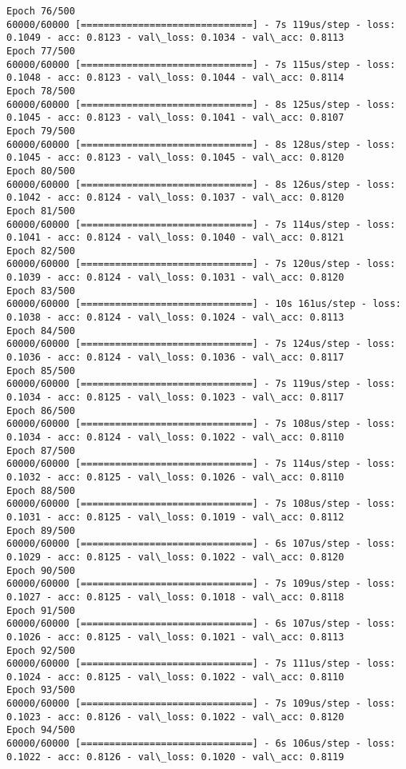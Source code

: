 \documentclass[11pt]{article}
\begin{document}
\begin{Verbatim}[commandchars=\\\{\}]
Epoch 76/500
60000/60000 [==============================] - 7s 119us/step - loss: 0.1049 - acc: 0.8123 - val\_loss: 0.1034 - val\_acc: 0.8113
Epoch 77/500
60000/60000 [==============================] - 7s 115us/step - loss: 0.1048 - acc: 0.8123 - val\_loss: 0.1044 - val\_acc: 0.8114
Epoch 78/500
60000/60000 [==============================] - 8s 125us/step - loss: 0.1045 - acc: 0.8123 - val\_loss: 0.1041 - val\_acc: 0.8107
Epoch 79/500
60000/60000 [==============================] - 8s 128us/step - loss: 0.1045 - acc: 0.8123 - val\_loss: 0.1045 - val\_acc: 0.8120
Epoch 80/500
60000/60000 [==============================] - 8s 126us/step - loss: 0.1042 - acc: 0.8124 - val\_loss: 0.1037 - val\_acc: 0.8120
Epoch 81/500
60000/60000 [==============================] - 7s 114us/step - loss: 0.1041 - acc: 0.8124 - val\_loss: 0.1040 - val\_acc: 0.8121
Epoch 82/500
60000/60000 [==============================] - 7s 120us/step - loss: 0.1039 - acc: 0.8124 - val\_loss: 0.1031 - val\_acc: 0.8120
Epoch 83/500
60000/60000 [==============================] - 10s 161us/step - loss: 0.1038 - acc: 0.8124 - val\_loss: 0.1024 - val\_acc: 0.8113
Epoch 84/500
60000/60000 [==============================] - 7s 124us/step - loss: 0.1036 - acc: 0.8124 - val\_loss: 0.1036 - val\_acc: 0.8117
Epoch 85/500
60000/60000 [==============================] - 7s 119us/step - loss: 0.1034 - acc: 0.8125 - val\_loss: 0.1023 - val\_acc: 0.8117
Epoch 86/500
60000/60000 [==============================] - 7s 108us/step - loss: 0.1034 - acc: 0.8124 - val\_loss: 0.1022 - val\_acc: 0.8110
Epoch 87/500
60000/60000 [==============================] - 7s 114us/step - loss: 0.1032 - acc: 0.8125 - val\_loss: 0.1026 - val\_acc: 0.8110
Epoch 88/500
60000/60000 [==============================] - 7s 108us/step - loss: 0.1031 - acc: 0.8125 - val\_loss: 0.1019 - val\_acc: 0.8112
Epoch 89/500
60000/60000 [==============================] - 6s 107us/step - loss: 0.1029 - acc: 0.8125 - val\_loss: 0.1022 - val\_acc: 0.8120
Epoch 90/500
60000/60000 [==============================] - 7s 109us/step - loss: 0.1027 - acc: 0.8125 - val\_loss: 0.1018 - val\_acc: 0.8118
Epoch 91/500
60000/60000 [==============================] - 6s 107us/step - loss: 0.1026 - acc: 0.8125 - val\_loss: 0.1021 - val\_acc: 0.8113
Epoch 92/500
60000/60000 [==============================] - 7s 111us/step - loss: 0.1024 - acc: 0.8125 - val\_loss: 0.1022 - val\_acc: 0.8110
Epoch 93/500
60000/60000 [==============================] - 7s 109us/step - loss: 0.1023 - acc: 0.8126 - val\_loss: 0.1022 - val\_acc: 0.8120
Epoch 94/500
60000/60000 [==============================] - 6s 106us/step - loss: 0.1022 - acc: 0.8126 - val\_loss: 0.1020 - val\_acc: 0.8119

\end{Verbatim}
\end{document}
